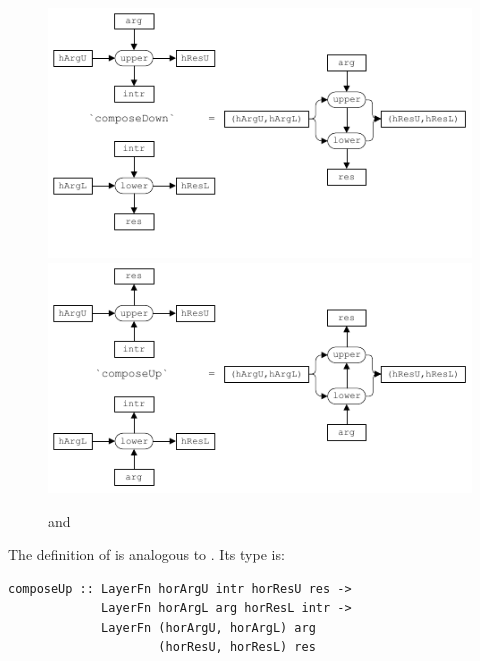 \documentclass[preprint,natbib]{sigplanconf}
\begin{document}
\begin{figure}
\includegraphics[width=\columnwidth]{images/ComposeDown}
\includegraphics[width=\columnwidth]{images/ComposeUp}
\caption{ and } \label{composeDownUp} 
\end{figure}




The definition of  is analogous to . Its type is:

\begin{small}
\begin{verbatim}
composeUp :: LayerFn horArgU intr horResU res ->
             LayerFn horArgL arg horResL intr ->
             LayerFn (horArgU, horArgL) arg
                     (horResU, horResL) res
\end{verbatim}
\end{small}

\end{document}
